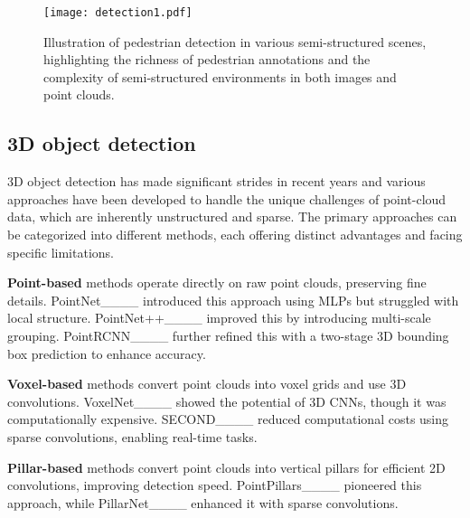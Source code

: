\begin{figure}[t!]
    \centering
    \texttt{[image: detection1.pdf]}
    \caption{Illustration of pedestrian detection in various semi-structured scenes, highlighting the richness of pedestrian annotations and the complexity of semi-structured environments in both images and point clouds.}
    \label{fig:detection}
\end{figure}

\subsection{3D object detection}

3D object detection has made significant strides in recent years and various approaches have been developed to handle the unique challenges of point-cloud data, which are inherently unstructured and sparse. The primary approaches can be categorized into different methods, each offering distinct advantages and facing specific limitations. 

\textbf{Point-based} methods operate directly on raw point clouds, preserving fine details. PointNet____ introduced this approach using MLPs but struggled with local structure. PointNet++____ improved this by introducing multi-scale grouping. PointRCNN____ further refined this with a two-stage 3D bounding box prediction to enhance accuracy.

\textbf{Voxel-based} methods convert point clouds into voxel grids and use 3D convolutions. VoxelNet____ showed the potential of 3D CNNs, though it was computationally expensive. SECOND____ reduced computational costs using sparse convolutions, enabling real-time tasks.

\textbf{Pillar-based} methods convert point clouds into vertical pillars for efficient 2D convolutions, improving detection speed. PointPillars____ pioneered this approach, while PillarNet____ enhanced it with sparse convolutions.
